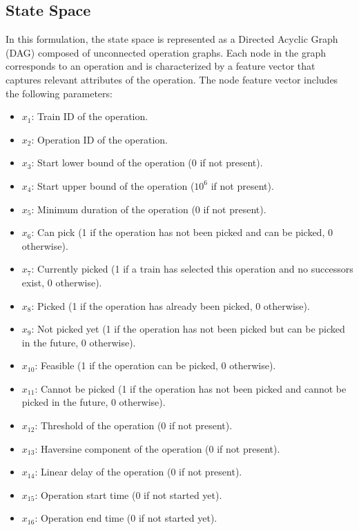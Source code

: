 \documentclass[runningheads]{llncs}
\begin{document}
\subsection{State Space}
\label{sss:state_space}

In this formulation, the state space is represented as a Directed Acyclic Graph (DAG) composed of unconnected operation graphs. 
Each node in the graph corresponds to an operation and is characterized by a feature vector that captures relevant attributes of the operation. 
The node feature vector includes the following parameters:

\begin{itemize}
    \item $x_1$: Train ID of the operation.
    \item $x_2$: Operation ID of the operation.
    \item $x_3$: Start lower bound of the operation (0 if not present).
    \item $x_4$: Start upper bound of the operation ($10^6$ if not present).
    \item $x_5$: Minimum duration of the operation (0 if not present).
    \item $x_6$: Can pick (1 if the operation has not been picked and can be picked, 0 otherwise).
    \item $x_7$: Currently picked (1 if a train has selected this operation and no successors exist, 0 otherwise).
    \item $x_8$: Picked (1 if the operation has already been picked, 0 otherwise).
    \item $x_9$: Not picked yet (1 if the operation has not been picked but can be picked in the future, 0 otherwise).
    \item $x_{10}$: Feasible (1 if the operation can be picked, 0 otherwise).
    \item $x_{11}$: Cannot be picked (1 if the operation has not been picked and cannot be picked in the future, 0 otherwise).
    \item $x_{12}$: Threshold of the operation (0 if not present).
    \item $x_{13}$: Haversine component of the operation (0 if not present).
    \item $x_{14}$: Linear delay of the operation (0 if not present).
    \item $x_{15}$: Operation start time (0 if not started yet).
    \item $x_{16}$: Operation end time (0 if not started yet).
\end{itemize}
\end{document}
